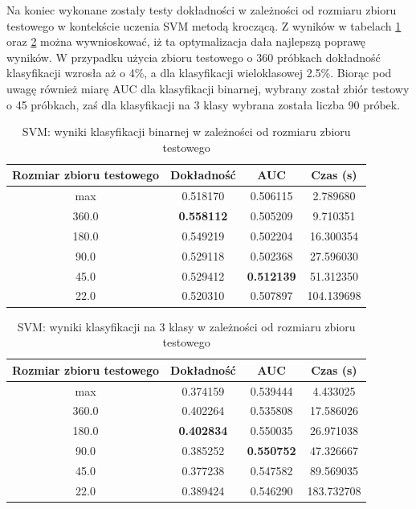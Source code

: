 \documentclass[a4paper, twoside, 11pt, openright]{article}
\begin{document}
Na koniec wykonane zostały testy dokładności w zależności od rozmiaru zbioru testowego w kontekście uczenia SVM metodą kroczącą. Z wyników w tabelach \ref{tab:svm_walk_forward_binary} oraz \ref{tab:svm_walk_forward_discrete} można wywnioskować, iż ta optymalizacja dała najlepszą poprawę wyników. W przypadku użycia zbioru testowego o 360 próbkach dokładność klasyfikacji wzrosła aż o 4\%, a dla klasyfikacji wieloklasowej 2.5\%. Biorąc pod uwagę również miarę AUC dla klasyfikacji binarnej, wybrany został zbiór testowy o 45 próbkach, zaś dla klasyfikacji na 3 klasy wybrana została liczba 90 próbek.


\begin{table}[H]
    \centering
    \begin{tabular}{|c|c|c|c|}
    \hline
        \textbf{Rozmiar zbioru testowego} & \textbf{Dokładność} & \textbf{AUC} & \textbf{Czas (s)} \\ \hline
max                        &   0.518170 &  0.506115 &    2.789680 \\ \hline
360.0                         &  \textbf{0.558112} &  0.505209 &    9.710351 \\ \hline
180.0                         &  0.549219 &  0.502204 &   16.300354 \\ \hline
90.0                          &  0.529118 &  0.502368 &   27.596030 \\ \hline
45.0                          &  0.529412 &  \textbf{0.512139} &   51.312350 \\ \hline
22.0                          &  0.520310 &  0.507897 &  104.139698 \\ \hline

    \end{tabular}
    \caption{SVM: wyniki klasyfikacji binarnej w zależności od rozmiaru zbioru testowego}
    \label{tab:svm_walk_forward_binary}
\end{table}



\begin{table}[H]
    \centering
    \begin{tabular}{|c|c|c|c|}
    \hline
        \textbf{Rozmiar zbioru testowego} & \textbf{Dokładność} & \textbf{AUC} & \textbf{Czas (s)} \\ \hline
max                       &  0.374159 &  0.539444 &    4.433025 \\ \hline
360.0                         &  0.402264 &  0.535808 &   17.586026 \\ \hline
180.0                         &  \textbf{0.402834} &  0.550035 &   26.971038 \\ \hline
90.0                          &  0.385252 &  \textbf{0.550752} &   47.326667 \\ \hline
45.0                          &  0.377238 &  0.547582 &   89.569035 \\ \hline
22.0                          &  0.389424 &  0.546290 &  183.732708 \\ \hline
    \end{tabular}
    \caption{SVM: wyniki klasyfikacji na 3 klasy w zależności od rozmiaru zbioru testowego}
    \label{tab:svm_walk_forward_discrete}
\end{table}
    
\end{document}
